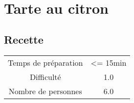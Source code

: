 \newpage
\section{Tarte au citron}
    \label{sec:Tarte au citron}
    \subsection{Recette}
    \vspace{1cm}


    \begin{center}
        \begin{tabular}{c|c}
            Temps de préparation & <= 15min \\
            Difficulté & 1.0 \\
            Nombre de personnes & 6.0 
        \end{tabular}
    \end{center}{}

    \vspace{1cm}
    \hline
    \vspace{1cm}

